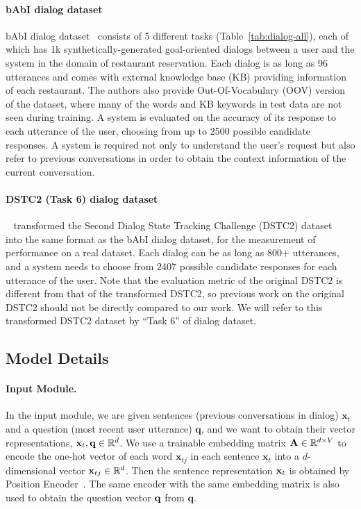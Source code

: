 \documentclass[table]{article}
\begin{document}
\paragraph{bAbI dialog dataset}
bAbI dialog dataset~\citep{bordes2016learning} consists of 5 different tasks (Table~\ref{tab:dialog-all}), each of which has 1k synthetically-generated goal-oriented dialogs between a user and the system in the domain of restaurant reservation. 
Each dialog is as long as 96 utterances and comes with external knowledge base (KB) providing information of each restaurant.
The authors also provide Out-Of-Vocabulary (OOV) version of the dataset, where many of the words and KB keywords in test data are not seen during training.
A system is evaluated on the accuracy of its response to each utterance of the user, choosing from up to 2500 possible candidate responses.
A system is required not only to understand the user's request but also refer to previous conversations in order to obtain the context information of the current conversation.




\paragraph{DSTC2 (Task 6) dialog dataset} 
~\cite{bordes2016learning} transformed the Second Dialog State Tracking Challenge (DSTC2) dataset~\citep{henderson2014second} into the same format as the bAbI dialog dataset, for the measurement of performance on a real dataset.
Each dialog can be as long as 800+ utterances, and a system needs to choose from 2407 possible candidate responses for each utterance of the user.
Note that the evaluation metric of the original DSTC2 is different from that of the transformed DSTC2, so previous work on the original DSTC2 should not be directly compared to our work.
We will refer to this transformed DSTC2 dataset by ``Task 6'' of dialog dataset.



\subsection{Model Details}

\paragraph{Input Module.} In the input module, we are given sentences (previous conversations in dialog) ${\bm x}_t$ and a question (most recent user utterance) ${\bm q}$, and we want to obtain their vector representations, ${\bf x}_t, {\bf q} \in \mathbb{R}^d$.
We use a trainable embedding matrix ${\bf A} \in \mathbb{R}^{d \times V}$ to encode the one-hot vector of each word ${\bm x}_{tj}$ in each sentence ${\bm x}_t$ into a $d$-dimensional vector ${\bf x}_{tj} \in \mathbb{R}^d$.
Then the sentence representation ${\bf x}_t$ is obtained by Position Encoder~\citep{memNet}. The same encoder with the same embedding matrix is also used to obtain the question vector ${\bf q}$ from ${\bm q}$.
\end{document}
